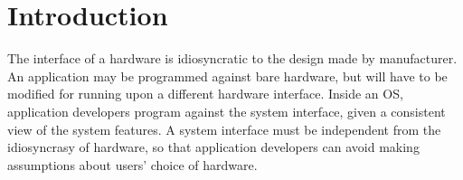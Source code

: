 \chapter{Introduction}
\label{chap:intro}

The interface of a hardware
is idiosyncratic to the design made by manufacturer.
An application may be programmed against bare hardware, but will have to be modified for running upon a different hardware interface.
Inside an OS, application developers program against the system interface, given a consistent view of the system features.
A system interface must be independent from the idiosyncrasy of hardware,
so that application developers can avoid making assumptions about users' choice of hardware.



















